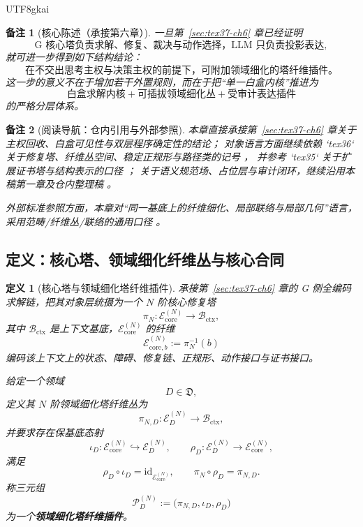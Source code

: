 \documentclass[12pt]{article}
\newtheorem{definition}{定义}[section]
\newtheorem{remark}{备注}[section]
\newcommand{\id}{\mathrm{id}}
\begin{document}
\begin{CJK*}{UTF8}{gkai}
\begin{remark}[核心陈述（承接第六章）]
一旦第~\ref{sec:tex37-ch6} 章已经证明
\[
  \boxed{
    \text{G 核心塔负责求解、修复、裁决与动作选择，LLM 只负责投影表达}
  },
\]
就可进一步得到如下结构结论：
\[
  \boxed{
    \text{在不交出思考主权与决策主权的前提下，可附加领域细化的塔纤维插件。}
  }
\]
这一步的意义不在于增加若干外置规则，而在于把“单一白盒内核”推进为
\[
  \text{白盒求解内核}
  +
  \text{可插拔领域细化丛}
  +
  \text{受审计表达插件}
\]
的严格分层体系。
\end{remark}

\begin{remark}[阅读导航：仓内引用与外部参照]
本章直接承接第~\ref{sec:tex37-ch6} 章关于主权回收、白盒可见性与双层程序确定性的结论；
对象语言方面继续依赖 `tex36` 关于修复塔、纤维丛空间、稳定正规形与路径类的记号 \cite{RepoTex36HomotopyTwistBijection}，
并参考 `tex35` 关于扩展证书塔与结构表示的口径 \cite{RepoTex35ExtendedCertificationTower}；
关于语义规范场、占位层与审计闭环，继续沿用本稿第一章及仓内整理稿 \cite{RepoTex20SemanticGaugeNormalization,RepoTex21AuditedWrapper,RepoTex23SemanticBase,
  GaoZhengAppVol2,GaoZhengAppVol3,GaoZheng2025GFramework}。

外部标准参照方面，本章对“同一基底上的纤维细化、局部联络与局部几何”语言，采用范畴/纤维丛/联络的通用口径 \cite{MacLane1998Categories,KobayashiNomizu1963Foundations,
  Hatcher2002AT}。
\end{remark}

\subsection{定义：核心塔、领域细化纤维丛与核心合同}
\label{subsec:tex37-ch7-definitions}

\begin{definition}[核心塔与领域细化塔纤维插件]
\label{def:tex37-ch7-core-plugin}
承接第~\ref{sec:tex37-ch6} 章的 G 侧全编码求解链，把其对象层统摄为一个 $N$ 阶核心修复塔
\[
  \pi_N:\mathcal E_{\mathrm{core}}^{(N)}\to \mathcal B_{\mathrm{ctx}},
\]
其中 $\mathcal B_{\mathrm{ctx}}$ 是上下文基底，$\mathcal E_{\mathrm{core}}^{(N)}$ 的纤维
\[
  \mathcal E_{\mathrm{core},b}^{(N)}:=\pi_N^{-1}(b)
\]
编码该上下文上的状态、障碍、修复链、正规形、动作接口与证书接口。

给定一个领域
\[
  D\in\mathfrak D,
\]
定义其 $N$ 阶领域细化塔纤维丛为
\[
  \pi_{N,D}:\mathcal E_D^{(N)}\to \mathcal B_{\mathrm{ctx}},
\]
并要求存在保基底态射
\[
  \iota_D:\mathcal E_{\mathrm{core}}^{(N)}\hookrightarrow \mathcal E_D^{(N)},
  \qquad
  \rho_D:\mathcal E_D^{(N)}\to \mathcal E_{\mathrm{core}}^{(N)},
\]
满足
\[
  \rho_D\circ \iota_D=\id_{\mathcal E_{\mathrm{core}}^{(N)}},
  \qquad
  \pi_N\circ \rho_D=\pi_{N,D}.
\]
称三元组
\[
  \mathcal P_D^{(N)}
  :=
  \bigl(
    \pi_{N,D},
    \iota_D,
    \rho_D
  \bigr)
\]
为一个\textbf{领域细化塔纤维插件}。
\end{definition}


\end{CJK*}
\end{document}
